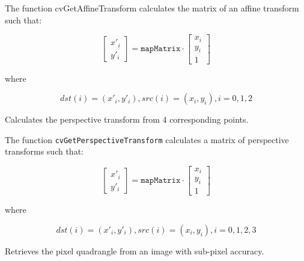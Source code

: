 The function cvGetAffineTransform calculates the matrix of an affine transform such that:

\[
\begin{bmatrix}
x'_i\\
y'_i
\end{bmatrix}
=
\texttt{mapMatrix}
\cdot
\begin{bmatrix}
x_i\\
y_i\\
1
\end{bmatrix}
\]

where

\[
dst(i)=(x'_i,y'_i),
src(i)=(x_i, y_i),
i=0,1,2
\]

Calculates the perspective transform from 4 corresponding points.


\begin{description}
\end{description}

The function \texttt{cvGetPerspectiveTransform} calculates a matrix of perspective transforms such that:

\[
\begin{bmatrix}
x'_i\\
y'_i
\end{bmatrix}
=
\texttt{mapMatrix}
\cdot
\begin{bmatrix}
x_i\\
y_i\\
1
\end{bmatrix}
\]

where

\[
dst(i)=(x'_i,y'_i),
src(i)=(x_i, y_i),
i=0,1,2,3
\]

Retrieves the pixel quadrangle from an image with sub-pixel accuracy.


